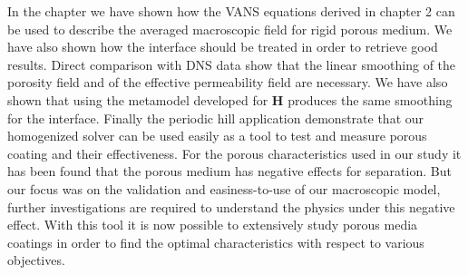 In the chapter we have shown how the VANS equations derived in chapter 2 can be used to describe the averaged macroscopic field for rigid porous medium. We have also shown how the interface should be treated in order to retrieve good results. Direct comparison with DNS data show that the linear smoothing of the porosity field and of the effective permeability field are necessary. We have also shown that using the metamodel developed for $\mathbf{H}$ produces the same smoothing for the interface. Finally the periodic hill application demonstrate that our homogenized solver can be used easily as a tool to test and measure porous coating and their effectiveness.
For the porous characteristics used in our study it has been found that the porous medium has negative effects for separation. But our focus was on the validation and easiness-to-use of our macroscopic model, further investigations are required to understand the physics under this negative effect. With this tool it is now possible to extensively study porous media coatings in order to find the optimal characteristics with respect to various objectives.

